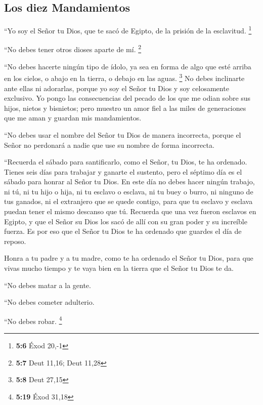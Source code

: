 \hypertarget{los-diez-mandamientos}{%
\subsection{Los diez Mandamientos}\label{los-diez-mandamientos}}

 ``Yo soy el Señor tu Dios, que te sacó de Egipto, de la
prisión de la esclavitud. \footnote{\textbf{5:6} Éxod 20,-1}

 ``No debes tener otros dioses aparte de mí. \footnote{\textbf{5:7}
  Deut 11,16; Deut 11,28}

 ``No debes hacerte ningún tipo de ídolo, ya sea en forma
de algo que esté arriba en los cielos, o abajo en la tierra, o debajo en
las aguas. \footnote{\textbf{5:8} Deut 27,15}  No debes
inclinarte ante ellas ni adorarlas, porque yo soy el Señor tu Dios y soy
celosamente exclusivo. Yo pongo las consecuencias del pecado de los que
me odian sobre sus hijos, nietos y bisnietos;  pero
muestro un amor fiel a las miles de generaciones que me aman y guardan
mis mandamientos.

 ``No debes usar el nombre del Señor tu Dios de manera
incorrecta, porque el Señor no perdonará a nadie que use su nombre de
forma incorrecta.

 ``Recuerda el sábado para santificarlo, como el Señor,
tu Dios, te ha ordenado.  Tienes seis días para trabajar
y ganarte el sustento,  pero el séptimo día es el sábado
para honrar al Señor tu Dios. En este día no debes hacer ningún trabajo,
ni tú, ni tu hijo o hija, ni tu esclavo o esclava, ni tu buey o burro,
ni ninguno de tus ganados, ni el extranjero que se quede contigo, para
que tu esclavo y esclava puedan tener el mismo descanso que tú.
 Recuerda que una vez fueron esclavos en Egipto, y que el
Señor su Dios los sacó de allí con su gran poder y su increíble fuerza.
Es por eso que el Señor tu Dios te ha ordenado que guardes el día de
reposo.

 Honra a tu padre y a tu madre, como te ha ordenado el
Señor tu Dios, para que vivas mucho tiempo y te vaya bien en la tierra
que el Señor tu Dios te da.

 ``No debes matar a la gente.

 ``No debes cometer adulterio.

 ``No debes robar. \footnote{\textbf{5:19} Éxod 31,18}

